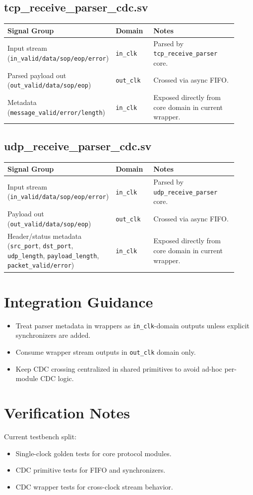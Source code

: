 \documentclass[10pt]{article}
\begin{document}
\subsection*{tcp\_receive\_parser\_cdc.sv}
\begin{longtable}{>{\raggedright\arraybackslash}p{0.22\linewidth} >{\raggedright\arraybackslash}p{0.20\linewidth} >{\raggedright\arraybackslash}p{0.50\linewidth}}
\toprule
\textbf{Signal Group} & \textbf{Domain} & \textbf{Notes} \\
\midrule
\endhead
Input stream (\texttt{in\_valid/data/sop/eop/error}) & \texttt{in\_clk} & Parsed by \texttt{tcp\_receive\_parser} core. \\
Parsed payload out (\texttt{out\_valid/data/sop/eop}) & \texttt{out\_clk} & Crossed via async FIFO. \\
Metadata (\texttt{message\_valid/error/length}) & \texttt{in\_clk} & Exposed directly from core domain in current wrapper. \\
\bottomrule
\end{longtable}

\subsection*{udp\_receive\_parser\_cdc.sv}
\begin{longtable}{>{\raggedright\arraybackslash}p{0.22\linewidth} >{\raggedright\arraybackslash}p{0.20\linewidth} >{\raggedright\arraybackslash}p{0.50\linewidth}}
\toprule
\textbf{Signal Group} & \textbf{Domain} & \textbf{Notes} \\
\midrule
\endhead
Input stream (\texttt{in\_valid/data/sop/eop/error}) & \texttt{in\_clk} & Parsed by \texttt{udp\_receive\_parser} core. \\
Payload out (\texttt{out\_valid/data/sop/eop}) & \texttt{out\_clk} & Crossed via async FIFO. \\
Header/status metadata (\texttt{src\_port}, \texttt{dst\_port}, \texttt{udp\_length}, \texttt{payload\_length}, \texttt{packet\_valid/error}) & \texttt{in\_clk} & Exposed directly from core domain in current wrapper. \\
\bottomrule
\end{longtable}

\section*{Integration Guidance}
\begin{itemize}
    \item Treat parser metadata in wrappers as \texttt{in\_clk}-domain outputs unless explicit synchronizers are added.
    \item Consume wrapper stream outputs in \texttt{out\_clk} domain only.
    \item Keep CDC crossing centralized in shared primitives to avoid ad-hoc per-module CDC logic.
\end{itemize}

\section*{Verification Notes}
Current testbench split:
\begin{itemize}
    \item Single-clock golden tests for core protocol modules.
    \item CDC primitive tests for FIFO and synchronizers.
    \item CDC wrapper tests for cross-clock stream behavior.
\end{itemize}
\end{document}
